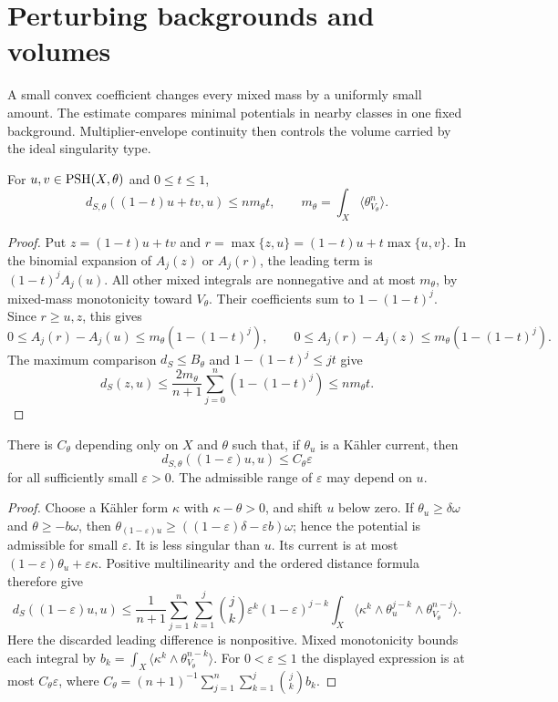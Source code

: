 \section{Perturbing backgrounds and volumes}
\label{sec:singularity-background-perturbation}
A small convex coefficient changes every mixed mass by a uniformly small amount. The estimate compares minimal potentials in nearby classes in one fixed background. Multiplier-envelope continuity then controls the volume carried by the ideal singularity type.

\begin{lemma}\label{lem:singularity-uniform-convex-perturbation}
For $u,v\in\mathrm{PSH}(X,\theta)$ and $0\leq t\leq1$,
\[
 d_{S,\theta}((1-t)u+tv,u)\leq nm_\theta t,
              \qquad m_\theta=\int_X\langle\theta_{V_\theta}^n\rangle.
\]
\end{lemma}
\begin{proof}
Put $z=(1-t)u+tv$ and $r=\max\{z,u\}=(1-t)u+t\max\{u,v\}$. In the binomial expansion of $A_j(z)$ or $A_j(r)$, the leading term is $(1-t)^jA_j(u)$. All other mixed integrals are nonnegative and at most $m_\theta$, by mixed-mass monotonicity toward $V_\theta$. Their coefficients sum to $1-(1-t)^j$. Since $r\geq u,z$, this gives
\[
 0\leq A_j(r)-A_j(u)\leq m_\theta(1-(1-t)^j),\qquad
 0\leq A_j(r)-A_j(z)\leq m_\theta(1-(1-t)^j).
\]
The maximum comparison $d_S\leq B_\theta$ and $1-(1-t)^j\leq jt$ give
\[
 d_S(z,u)\leq\frac{2m_\theta}{n+1}
                  \sum_{j=0}^n(1-(1-t)^j)\leq nm_\theta t.
\]
\end{proof}

\begin{lemma}\label{lem:singularity-small-scaling-in-fixed-class}
There is $C_\theta$ depending only on $X$ and $\theta$ such that, if $\theta_u$ is a K\"ahler current, then
\[
 d_{S,\theta}((1-\varepsilon)u,u)\leq C_\theta\varepsilon
\]
for all sufficiently small $\varepsilon>0$. The admissible range of $\varepsilon$ may depend on $u$.
\end{lemma}
\begin{proof}
Choose a K\"ahler form $\kappa$ with $\kappa-\theta>0$, and shift $u$ below zero. If $\theta_u\geq\delta\omega$ and $\theta\geq-b\omega$, then
$\theta_{(1-\varepsilon)u}\geq((1-\varepsilon)\delta-\varepsilon b)\omega$; hence the potential is admissible for small $\varepsilon$. It is less singular than $u$. Its current is at most $(1-\varepsilon)\theta_u+\varepsilon\kappa$. Positive multilinearity and the ordered distance formula therefore give
\[
 d_S((1-\varepsilon)u,u)
 \leq\frac1{n+1}\sum_{j=1}^n\sum_{k=1}^j
       \binom jk\varepsilon^k(1-\varepsilon)^{j-k}
       \int_X\langle\kappa^k\wedge\theta_u^{j-k}
                                    \wedge\theta_{V_\theta}^{n-j}\rangle.
\]
Here the discarded leading difference is nonpositive. Mixed monotonicity bounds each integral by
$b_k=\int_X\langle\kappa^k\wedge\theta_{V_\theta}^{n-k}\rangle$.
For $0<\varepsilon\leq1$ the displayed expression is at most
$C_\theta\varepsilon$, where
$C_\theta=(n+1)^{-1}\sum_{j=1}^n\sum_{k=1}^j\binom jk b_k$.
\end{proof}

